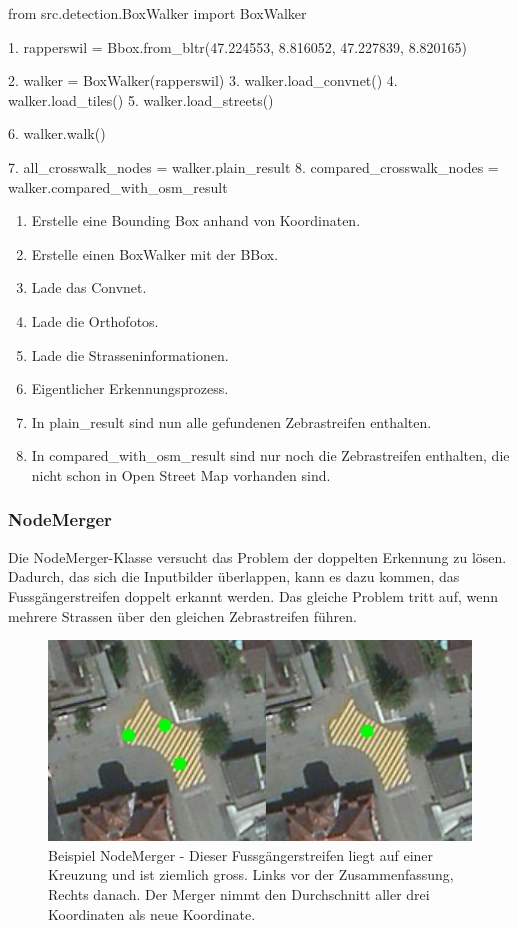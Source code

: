 \begin{python}
	from src.detection.BoxWalker import BoxWalker
	
	1. rapperswil = Bbox.from_bltr(47.224553, 8.816052, 47.227839, 8.820165)
	
	2. walker = BoxWalker(rapperswil)
	3. walker.load_convnet()
	4. walker.load_tiles()
	5. walker.load_streets()
	
	6. walker.walk()
	
	7. all_crosswalk_nodes = walker.plain_result
	8. compared_crosswalk_nodes = walker.compared_with_osm_result
\end{python}
\begin{enumerate}
	\item Erstelle eine Bounding Box anhand von Koordinaten.
	\item Erstelle einen BoxWalker mit der BBox.
	\item Lade das Convnet.
	\item Lade die Orthofotos.
	\item Lade die Strasseninformationen.
	\item Eigentlicher Erkennungsprozess.
	\item In plain\_result sind nun alle gefundenen Zebrastreifen enthalten.
	\item In compared\_with\_osm\_result sind nur noch die Zebrastreifen enthalten, die nicht schon in Open Street Map vorhanden sind.
\end{enumerate}

\subsubsection{NodeMerger}
Die NodeMerger-Klasse versucht das Problem der doppelten Erkennung zu lösen. Dadurch, das sich die Inputbilder überlappen, kann es dazu kommen, das Fussgängerstreifen doppelt erkannt werden. Das gleiche Problem tritt auf, wenn mehrere Strassen über den gleichen Zebrastreifen führen.
\\
\begin{figure}[H]
	\centering
	\includegraphics{images/NodeMerger_Beispiel.png}
	\caption[Beispiele NodeMerger]{Beispiel NodeMerger - Dieser Fussgängerstreifen liegt auf einer Kreuzung und ist ziemlich gross. Links vor der Zusammenfassung, Rechts danach. Der Merger nimmt den Durchschnitt aller drei Koordinaten als neue Koordinate.}
\end{figure}



